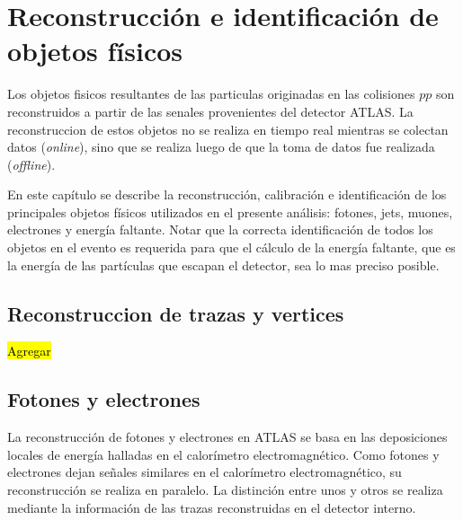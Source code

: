 \chapter{Reconstrucción e identificación de objetos físicos}
\label{cap:objetos}


Los objetos fisicos resultantes de las particulas originadas en las colisiones
$pp$ son reconstruidos a partir de las senales provenientes del detector ATLAS.
La reconstruccion de estos objetos no se realiza en tiempo real mientras se
colectan datos (\emph{online}), sino que se realiza luego de que la toma de
datos fue realizada (\emph{offline}).

En este capítulo se describe la reconstrucción, calibración e identificación de
los principales objetos físicos utilizados en el presente análisis: fotones,
jets, muones, electrones y energía faltante. Notar que la correcta
identificación de todos los objetos en el evento es requerida para que el
cálculo de la energía faltante, que es la energía de las partículas que escapan
el detector, sea lo mas preciso posible.


\section{Reconstruccion de trazas y vertices}
\label{sec:obj_vertex}

\hl{Agregar}




\section{Fotones y electrones}
\label{sec:obj_photons}

La reconstrucción de fotones y electrones en ATLAS se basa en las deposiciones
locales de energía halladas en el calorímetro electromagnético. Como fotones y
electrones dejan señales similares en el calorímetro electromagnético, su
reconstrucción se realiza en paralelo. La distinción entre unos y otros se
realiza mediante la información de las trazas reconstruidas en el detector
interno.

